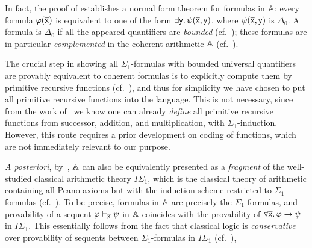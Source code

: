 \begin{remark}\label{rem:normalformincoharith}
  In fact, the proof of \citet[Prop.~3]{ye_categorical_2026} establishes a normal form theorem for formulas in $\mathbb{A}$: every formula $\varphi(\overline{\mathsf{x}})$ is equivalent to one of the form $\exists\mathsf{y}.\,\psi(\overline{\mathsf{x}},\mathsf{y})$, where $\psi(\overline{\mathsf{x}},\mathsf{y})$ is $\Delta_0$. A formula is $\Delta_0$ if all the appeared quantifiers are \emph{bounded} (cf.~\citet[Thm.~I.1.61]{Hájek_Pudlák_2017}); these formulas are in particular \emph{complemented} in the coherent arithmetic $\mathbb{A}$ (cf.~\citet[\S 3.4]{ye_categorical_2026}).
\end{remark}

\begin{remark}
  The crucial step in showing all $\Sigma_1$-formulas with bounded universal quantifiers are provably equivalent to coherent formulas is to explicitly compute them by primitive recursive functions (cf.~\citet[\S 3]{ye_categorical_2026}), and thus for simplicity we have chosen to put all primitive recursive functions into the language. This is not necessary, since from the work of~\citet{godel_uber_1931} we know one can already \emph{define} all primitive recursive functions from successor, addition, and multiplication, with $\Sigma_1$-induction. However, this route requires a prior development on coding of functions, which are not immediately relevant to our purpose.
\end{remark}

\begin{remark}\label{rem:classicalpresentationofcoharith}
  \emph{A posteriori}, by~\citet[Cor.~5]{ye_categorical_2026}, $\mathbb{A}$ can also be equivalently presented as a \emph{fragment} of the well-studied classical arithmetic theory $I\Sigma_1$, which is the classical theory of arithmetic containing all Peano axioms but with the induction scheme restricted to $\Sigma_1$-formulas (cf.~\citet[\S I.1.(c)]{Hájek_Pudlák_2017}). To be precise, formulas in $\mathbb{A}$ are precisely the $\Sigma_1$-formulas, and provability of a sequent $\varphi\vdash_{\overline{\mathsf{x}}}\psi$ in $\mathbb{A}$ coincides with the provability of $\forall{\overline{\mathsf{x}}}.\, \varphi \to \psi$ in $I\Sigma_1$. This essentially follows from the fact that classical logic is \emph{conservative} over provability of sequents between $\Sigma_1$-formulas in $I\Sigma_1$ (cf.~\citet[\S 6]{ye_categorical_2026}), 
\end{remark}

